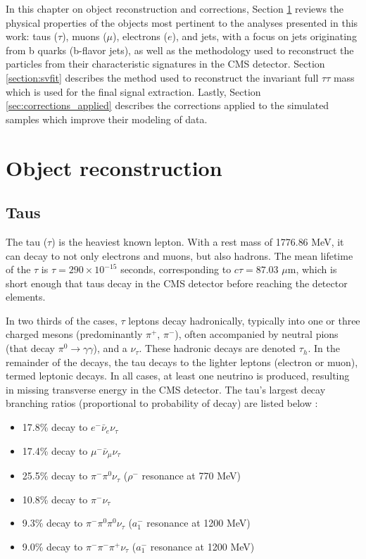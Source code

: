 In this chapter on object reconstruction and corrections, Section \ref{sec:object-reconstruction} reviews the physical properties of the objects most pertinent to the analyses presented in this work: taus ($\tau$), muons ($\mu$), electrons ($e$), and jets, with a focus on jets originating from b quarks (b-flavor jets), as well as the methodology used to reconstruct the particles from their characteristic signatures in the CMS detector. Section \ref{section:svfit} describes the method used to reconstruct the invariant full $\tau\tau$ mass which is used for the final signal extraction. Lastly, Section \ref{sec:corrections_applied} describes the corrections applied to the simulated samples which improve their modeling of data.

\section{Object reconstruction}
\label{sec:object-reconstruction}
\subsection{Taus}
The tau ($\tau$) is the heaviest known lepton. With a rest mass of 1776.86 MeV, it can decay to not only electrons and muons, but also hadrons. The mean lifetime of the $\tau$ is $\tau = 290 \times 10^{-15}$ seconds, corresponding to $c\tau = 87.03$ $\mu$m, which is short enough that taus decay in the CMS detector before reaching the detector elements. 

In two thirds of the cases, $\tau$ leptons decay hadronically, typically into one or three charged mesons (predominantly $\pi^+$, $\pi^-$), often accompanied by neutral pions (that decay $\pi^0 \rightarrow \gamma\gamma$), and a $\nu_{\tau}$. These hadronic decays are denoted $\tau_{h}$. In the remainder of the decays, the tau decays to the lighter leptons (electron or muon), termed leptonic decays. In all cases, at least one neutrino is produced, resulting in missing transverse energy in the CMS detector. The tau's largest decay branching ratios (proportional to probability of decay) are listed below \citep{workman_review_2022}: 
\begin{itemize}
    \item 17.8\% decay to $e^- \bar{\nu}_e \nu_{\tau}$
    \item 17.4\% decay to $\mu^- \bar{\nu}_\mu \nu_{\tau}$
    \item 25.5\% decay to $\pi^- \pi^0 \nu_{\tau}$ ($\rho^-$ resonance at 770 MeV)
    \item 10.8\% decay to $\pi^- \nu_{\tau}$ %
    \item 9.3\% decay to $\pi^- \pi^0 \pi^0 \nu_{\tau}$  ($a_1^-$ resonance at 1200 MeV)
    \item 9.0\% decay to $\pi^- \pi^- \pi^+ \nu_{\tau}$ ($a_1^-$ resonance at 1200 MeV)
\end{itemize}

